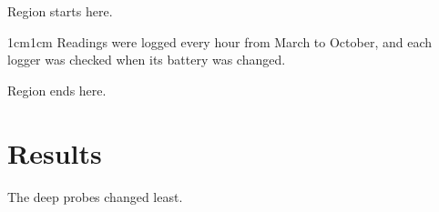 \documentclass[11pt]{article}
\begin{document}
Region starts here.

\begin{adjustwidth}{1cm}{1cm}
Readings were logged every hour from March to October, and each logger was checked when its battery was changed.
\end{adjustwidth}

Region ends here.

\section{Results}
The deep probes changed least.
\end{document}
